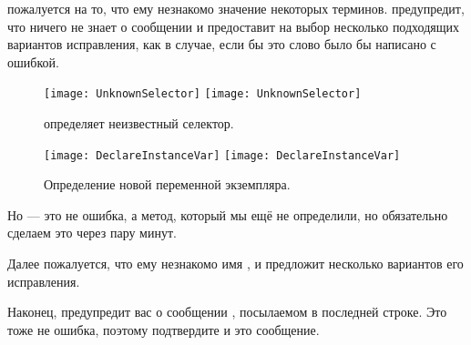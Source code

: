 \documentclass[a4paper,10pt,twoside]{book}
\begin{document}
{%

\pharo пожалуется на то, что ему незнакомо значение некоторых терминов.
\pharo предупредит, что ничего не знает о сообщении  и предоставит на выбор несколько подходящих вариантов исправления, как в случае, если бы это слово было бы написано с ошибкой.


\begin{figure}[htb]
\begin{minipage}{0.48\textwidth}
	\centering
	\ifluluelse
		{\texttt{[image: UnknownSelector]}}
		{\texttt{[image: UnknownSelector]}}
	\caption{\pharo определяет неизвестный селектор.}
\end{minipage}
\hfill
\begin{minipage}{0.48\textwidth}
	\centering
	\ifluluelse
		{\texttt{[image: DeclareInstanceVar]}}
		{\texttt{[image: DeclareInstanceVar]}}
	\caption{Определение новой переменной экземпляра.\figlabel{declareInstance}}
\end{minipage}
\end{figure}

Но  --- это не ошибка, а метод, который мы ещё не определили, но обязательно сделаем это через пару минут.


Далее \pharo пожалуется, что ему незнакомо имя , и предложит несколько вариантов его исправления.

Наконец, \pharo предупредит вас о сообщении , посылаемом в последней строке. Это тоже не ошибка, поэтому подтвердите и это сообщение.

}
\end{document}
